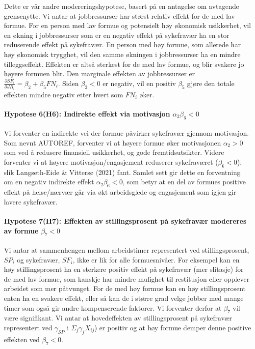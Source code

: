 \documentclass[
  12pt,
  a4paper,
  DIV=11,
  numbers=noendperiod]{scrartcl}
\let\oldparagraph\paragraph
\renewcommand{\paragraph}[1]{\oldparagraph{#1}\mbox{}}
\begin{document}
Dette er vår andre modereringshypotese, basert på en antagelse om
avtagende grensenytte. Vi antar at jobbressurser har størst relativ
effekt for de med lav formue. For en person med lav formue og potensielt
høy økonomisk usikkerhet, vil en økning i jobbressurser som er en
negativ effekt på sykefravær ha en stor reduserende effekt på
sykefravær. En person med høy formue, som allerede har høy økonomisk
trygghet, vil den samme økningen i jobbressurser ha en mindre
tilleggseffekt. Effekten er altså sterkest for de med lav formue, og
blir svakere jo høyere formuen blir. Den marginale effekten av
jobbressurser er
\(\frac{\partial SF_i}{\partial JR_i} = \beta_2 + \beta_5 FN_i\). Siden
\(\beta_2 < 0\) er negativ, vil en positiv \(\beta_5\) gjøre den totale
effekten mindre negativ etter hvert som \(FN_i\) øker.

\paragraph{\texorpdfstring{Hypotese 6(H6): Indirekte effekt via
motivasjon
\(\alpha_2\beta_6 < 0\)}{Hypotese 6(H6): Indirekte effekt via motivasjon \textbackslash alpha\_2\textbackslash beta\_6 \textless{} 0}}\label{hypotese-6h6-indirekte-effekt-via-motivasjon-alpha_2beta_6-0}

Vi forventer en indirekte vei der formue påvirker sykefravær gjennom
motivasjon. Som nevnt AUTOREF, forventer vi at høyere formue øker
motivasjonen \(\alpha_2 > 0\) som ved å redusere finansiell usikkerhet,
og gode fremtidsutsikter. Videre forventer vi at høyere
motivasjon/engasjement reduserer sykefraværet (\(\beta_6 <0\)), slik
Langseth-Eide \& Vittersø (2021) fant. Samlet sett gir dette en
forventning om en negativ indirekte effekt \(\alpha_2 \beta_6 <0\), som
betyr at en del av formues positive effekt på helse/nærvær går via økt
arbeidsglede og engasjement som igjen gir lavere sykefravær.

\paragraph{\texorpdfstring{Hypotese 7(H7): Effekten av stillingsprosent
på sykefravær modereres av formue
\(\beta_7 < 0\)}{Hypotese 7(H7): Effekten av stillingsprosent på sykefravær modereres av formue \textbackslash beta\_7 \textless{} 0}}\label{hypotese-7h7-effekten-av-stillingsprosent-puxe5-sykefravuxe6r-modereres-av-formue-beta_7-0}

Vi antar at sammenhengen mellom arbeidstimer representert ved
stillingsprosent, \(SP_i\) og sykefravær, \(SF_i\), ikke er lik for alle
formuesnivåer. For eksempel kan en høy stillingsprosent ha en sterkere
positiv effekt på sykefravær (mer slitasje) for de med lav formue, som
kanskje har mindre mulighet til restitusjon eller opplever arbeidet som
mer påtvunget. For de med høy formue kan en høy stillingsprosent enten
ha en svakere effekt, eller så kan de i større grad velge jobber med
mange timer som også gir andre kompenserende faktorer. Vi forventer
derfor at \(\beta_7\) vil være signifikant. Vi antar at hovedeffekten av
stillingsprosent på sykefravær representert ved \(\gamma_{SP}\) i
\(\Sigma_j \gamma_{j}X_{ij}\)) er positiv og at høy formue demper denne
positive effekten ved \(\beta_7 < 0\).
\end{document}
